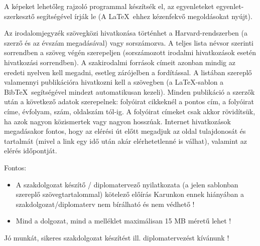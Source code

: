 A képeket lehetőleg rajzoló programmal készítsék el, az egyenleteket egyenlet-szerkesztő segítségével írják le (A \LaTeX~ehhez kézenfekvő megoldásokat nyújt).

Az irodalomjegyzék szövegközi hivatkozása történhet a Harvard-rendszerben (a szerző és az évszám megadásával) vagy sorszámozva. A teljes lista névsor szerinti sorrendben a szöveg végén szerepeljen (sorszámozott irodalmi hivatkozások esetén hivatkozási sorrendben). A szakirodalmi források címeit azonban mindig az eredeti nyelven kell megadni, esetleg zárójelben a fordítással. A listában szereplő valamennyi publikációra hivatkozni kell a szövegben (a \LaTeX-sablon a Bib\TeX~segítségével mindezt automatikusan kezeli). Minden publikáció a szerzők után a következő adatok szerepelnek: folyóirat cikkeknél a pontos cím, a folyóirat címe, évfolyam, szám, oldalszám tól-ig. A folyóirat címeket csak akkor rövidítsük, ha azok nagyon közismertek vagy nagyon hosszúak. Internet hivatkozások megadásakor fontos, hogy az elérési út előtt megadjuk az oldal tulajdonosát és tartalmát (mivel a link egy idő után akár elérhetetlenné is válhat), valamint az elérés időpontját.

\vspace{5mm}
Fontos:
\begin{itemize}
	\item A szakdolgozat készítő / diplomatervező nyilatkozata (a jelen sablonban szereplő szövegtartalommal) kötelező előírás Karunkon ennek hiányában a szakdolgozat/diplomaterv nem bírálható és nem védhető !
	\item Mind a dolgozat, mind a melléklet maximálisan 15 MB méretű lehet !
\end{itemize}

\vspace{5mm}
\begin{center}
Jó munkát, sikeres szakdolgozat készítést ill. diplomatervezést kívánunk !
\end{center}

\normalsize
